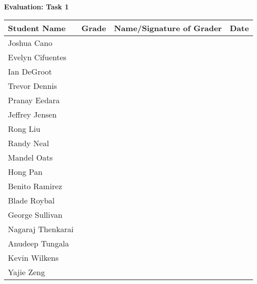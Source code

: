 \documentclass[11pt]{article}
\begin{document}
\begin{center}
{\bfseries \LARGE Evaluation: Task 1}
\end{center}

\begin{center}
\begin{tabular}{|p{1.75in}|p{0.75in}|p{2.5in}|p{0.75in}|}
\hline
\textbf{Student Name} & \textbf{Grade} & Name/Signature of Grader & Date \\
\hline
Joshua Cano & & & \\ \hline
Evelyn Cifuentes & & & \\ \hline
Ian DeGroot & & & \\ \hline
Trevor Dennis & & & \\ \hline
Pranay Eedara & & & \\ \hline
Jeffrey Jensen & & & \\ \hline
Rong Liu & & & \\ \hline
Randy Neal & & & \\ \hline
Mandel Oats & & & \\ \hline
Hong Pan & & & \\ \hline
Benito Ramirez & & & \\ \hline
Blade Roybal & & & \\ \hline
George Sullivan & & & \\ \hline
Nagaraj Thenkarai & & & \\ \hline
Anudeep Tungala & & & \\ \hline
Kevin Wilkens & & & \\ \hline
Yajie Zeng & & & \\ \hline
\end{tabular}
\end{center}
\end{document}
